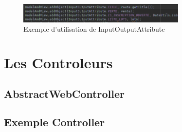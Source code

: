 		\begin{figure}[H]
			\centering\includegraphics[width=0.75\textwidth, keepaspectratio]{res/InputOutputAttribute-controller.png}
			\caption{Exemple d'utilisation de InputOutputAttribute}
		\end{figure}

	\section{Les Controleurs}

		\subsection{AbstractWebController}


		\subsection{Exemple Controller}

